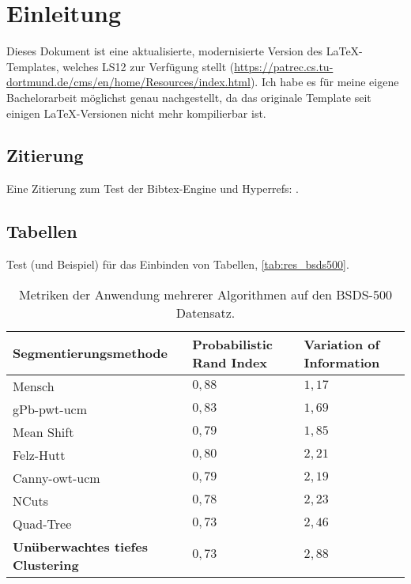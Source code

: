 \chapter{Einleitung}
\label{chap:einleitung}

Dieses Dokument ist eine aktualisierte, modernisierte Version des \LaTeX-Templates, welches LS12 zur Verfügung stellt (\vgl \url{https://patrec.cs.tu-dortmund.de/cms/en/home/Resources/index.html}). Ich habe es für meine eigene Bachelorarbeit möglichst genau nachgestellt, da das originale Template seit einigen \LaTeX-Versionen nicht mehr kompilierbar ist.

\section{Zitierung}
\label{sec:einleitung/zitierung}
Eine Zitierung zum Test der Bibtex-Engine und Hyperrefs: \cite{test}.

\section{Tabellen}
\label{sec:einleitung/tabellen}
Test (und Beispiel) für das Einbinden von Tabellen, \vgl \autoref{tab:res_bsds500}.

\begin{table}[h!]
	\begin{tabularx}{\textwidth}{p{} >{\centering} p{} >{\centering\arraybackslash} p{}}
		\toprule
		\textbf{Segmentierungsmethode} & \textbf{Probabilistic Rand Index} & \textbf{Variation of Information} \\
		\midrule
		Mensch & $0,88$ & $1,17$ \\
		\midrule
		gPb-pwt-ucm & $0,83$ & $1,69$ \\
		Mean Shift & $0,79$ & $1,85$ \\
		Felz-Hutt & $0,80$ & $2,21$ \\
		Canny-owt-ucm & $0,79$ & $2,19$ \\
		NCuts & $0,78$ & $2,23$ \\
		Quad-Tree & $0,73$ & $2,46$ \\
		\textbf{Unüberwachtes tiefes Clustering} & $0,73$ & $2,88$ \\
		\bottomrule
	\end{tabularx}
	\caption{Metriken der Anwendung mehrerer Algorithmen auf den BSDS-500 Datensatz.}
	\label{tab:res_bsds500}
\end{table}